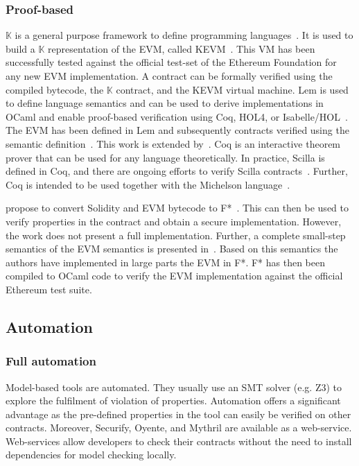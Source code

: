 \subsubsection{Proof-based}
$\mathbb{K}$ is a general purpose framework to define programming languages~\cite{Rosu2007}. It is used to build a $\mathbb{K}$ representation of the EVM, called KEVM~\cite{Hildenbrandt2017}. 
This VM has been successfully tested against the official test-set of the Ethereum Foundation for any new EVM implementation. 
A contract can be formally verified using the compiled bytecode, the $\mathbb{K}$ contract, and the KEVM virtual machine. 
Lem is used to define language semantics and can be used to derive implementations in OCaml and enable proof-based verification using Coq, HOL4, or Isabelle/HOL~\cite{Mulligan2014}. The EVM has been defined in Lem and subsequently contracts verified using the semantic definition~\cite{Hirai2017}. This work is extended by~\cite{Amani2018}. 
Coq is an interactive theorem prover that can be used for any language theoretically. In practice, Scilla is defined in Coq, and there are ongoing efforts to verify Scilla contracts~\cite{Sergey2018}. Further, Coq is intended to be used together with the Michelson language~\cite{DynamicLedgerSolutions2017}.

\citeauthor{Bhargavan2016} propose to convert Solidity and EVM bytecode to F*~\cite{Bhargavan2016}. This can then be used to verify properties in the contract and obtain a secure implementation. However, the work does not present a full implementation.
Further, a complete small-step semantics of the EVM semantics is presented in~\cite{Grishchenko2018}. Based on this semantics the authors have implemented in large parts the EVM in F*. F* has then been compiled to OCaml code to verify the EVM implementation against the official Ethereum test suite.

\subsection{Automation} 
\subsubsection{Full automation}
Model-based tools are automated. They usually use an SMT solver (e.g. Z3) to explore the fulfilment of violation of properties. Automation offers a significant advantage as the pre-defined properties in the tool can easily be verified on other contracts. Moreover, Securify, Oyente, and Mythril are available as a web-service. Web-services allow developers to check their contracts without the need to install dependencies for model checking locally.

